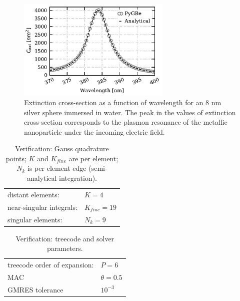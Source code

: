 \begin{figure}[h] %
    \centering
    \includegraphics[width=0.65\textwidth]{silver_NP_verification.pdf} 
    \caption{Extinction cross-section as a function of wavelength for an $8$ nm
             silver sphere immersed in water. The peak in the values of 
             extinction cross-section corresponds to the plasmon resonance of the metallic 
             nanoparticle under the incoming electric field.}
    \label{fig:verif_sph}
 \end{figure}

\begin{table}[h]
    \centering
    \caption{\label{table:quadparams2} Verification: Gauss quadrature points; 
    $K$ and $K_{fine}$ are per element; $N_k $ is per element edge (semi-analytical integration). } 
    \begin{tabular}{l l}
    \hline%
     distant elements: & $K=4$ \\
     near-singular integrals:   & $ K_{fine}=19$ \\
     singular elements:  & $N_k =9$ \\
    \hline%
    \end{tabular}
\end{table}

\begin{table}[h]
    \centering
    \caption{\label{table:treeparams2} Verification: treecode and solver parameters.} 
    \begin{tabular}{l l}
    \hline%
    treecode order of expansion: & $P=6$\\
    MAC                                         & $\theta=0.5$\\
    GMRES tolerance                    & $10^{-3}$\\
    \hline%
    \end{tabular}
\end{table}

